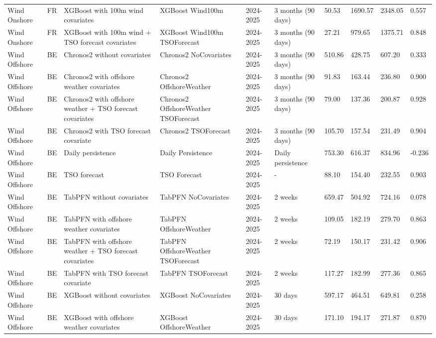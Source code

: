 \begin{longtable}{llllllllll}
Wind Onshore & FR & XGBoost with 100m wind covariates & XGBoost Wind100m & 2024-2025 & 3 months (90 days) & 50.53 & 1690.57 & 2348.05 & 0.557 \\
Wind Onshore & FR & XGBoost with 100m wind + TSO forecast covariates & XGBoost Wind100m TSOForecast & 2024-2025 & 3 months (90 days) & 27.21 & 979.65 & 1375.71 & 0.848 \\
Wind Offshore & BE & Chronos2 without covariates & Chronos2 NoCovariates & 2024-2025 & 3 months (90 days) & 510.86 & 428.75 & 607.20 & 0.333 \\
Wind Offshore & BE & Chronos2 with offshore weather covariates & Chronos2 OffshoreWeather & 2024-2025 & 3 months (90 days) & 91.83 & 163.44 & 236.80 & 0.900 \\
Wind Offshore & BE & Chronos2 with offshore weather + TSO forecast covariates & Chronos2 OffshoreWeather TSOForecast & 2024-2025 & 3 months (90 days) & 79.00 & 137.36 & 200.87 & 0.928 \\
Wind Offshore & BE & Chronos2 with TSO forecast covariate & Chronos2 TSOForecast & 2024-2025 & 3 months (90 days) & 105.70 & 157.54 & 231.49 & 0.904 \\
Wind Offshore & BE & Daily persistence & Daily Persistence & 2024-2025 & Daily persistence & 753.30 & 616.37 & 834.96 & -0.236 \\
Wind Offshore & BE & TSO forecast & TSO Forecast & 2024-2025 & - & 88.10 & 154.40 & 232.55 & 0.903 \\
Wind Offshore & BE & TabPFN without covariates & TabPFN NoCovariates & 2024-2025 & 2 weeks & 659.47 & 504.92 & 724.16 & 0.078 \\
Wind Offshore & BE & TabPFN with offshore weather covariates & TabPFN OffshoreWeather & 2024-2025 & 2 weeks & 109.05 & 182.19 & 279.70 & 0.863 \\
Wind Offshore & BE & TabPFN with offshore weather + TSO forecast covariates & TabPFN OffshoreWeather TSOForecast & 2024-2025 & 2 weeks & 72.19 & 150.17 & 231.42 & 0.906 \\
Wind Offshore & BE & TabPFN with TSO forecast covariate & TabPFN TSOForecast & 2024-2025 & 2 weeks & 117.27 & 182.99 & 277.36 & 0.865 \\
Wind Offshore & BE & XGBoost without covariates & XGBoost NoCovariates & 2024-2025 & 30 days & 597.17 & 464.51 & 649.81 & 0.258 \\
Wind Offshore & BE & XGBoost with offshore weather covariates & XGBoost OffshoreWeather & 2024-2025 & 30 days & 171.10 & 194.17 & 271.87 & 0.870 \\

\end{longtable}
